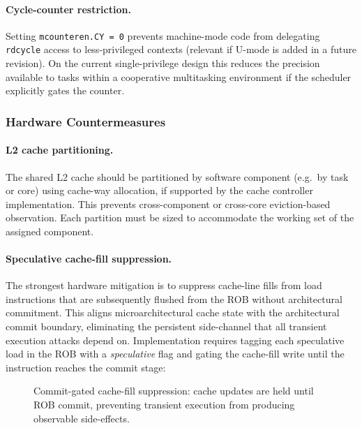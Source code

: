 \paragraph{Cycle-counter restriction.}
Setting \texttt{mcounteren.CY~=~0} prevents machine-mode code from delegating
\texttt{rdcycle} access to less-privileged contexts (relevant if U-mode is
added in a future revision). On the current single-privilege design this
reduces the precision available to tasks within a cooperative multitasking
environment if the scheduler explicitly gates the counter.

\subsubsection{Hardware Countermeasures}

\paragraph{L2 cache partitioning.}
The shared \mbox{L2} cache should be partitioned by software component (e.g.\
by task or core) using cache-way allocation, if supported by the cache
controller implementation. This prevents cross-component or cross-core
eviction-based observation. Each partition must be sized to accommodate the
working set of the assigned component.

\paragraph{Speculative cache-fill suppression.}
The strongest hardware mitigation is to suppress cache-line fills from load
instructions that are subsequently flushed from the ROB without architectural
commitment. This aligns microarchitectural cache state with the architectural
commit boundary, eliminating the persistent side-channel that all transient
execution attacks depend on. Implementation requires tagging each speculative
load in the ROB with a \emph{speculative} flag and gating the cache-fill write
until the instruction reaches the commit stage:

\begin{figure}[h]
  \centering
  \caption{Commit-gated cache-fill suppression: cache updates are held until
    ROB commit, preventing transient execution from producing observable side-effects.}
  \label{fig:cache_suppression}
\end{figure}

